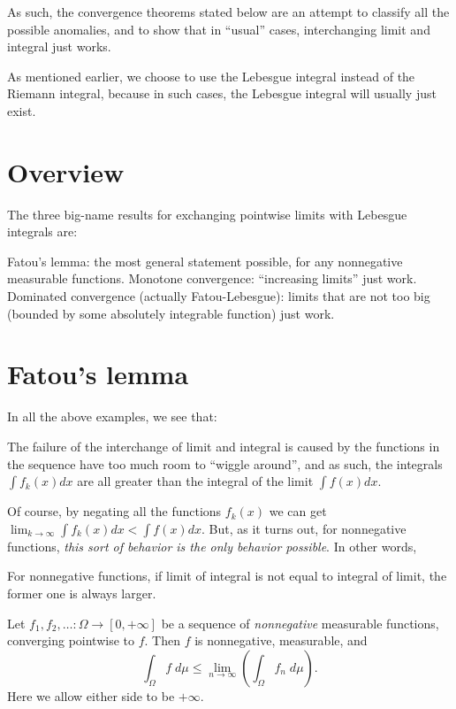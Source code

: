 As such, the convergence theorems stated below are an attempt to classify all the possible anomalies,
and to show that in ``usual'' cases, interchanging limit and integral just works.

As mentioned earlier, we choose to use the Lebesgue integral instead of the Riemann integral,
because in such cases, the Lebesgue integral will usually just exist.


\section{Overview}
The three big-name results for exchanging
pointwise limits with Lebesgue integrals are:
\begin{itemize}
	\ii Fatou's lemma: the most general statement possible,
	for any nonnegative measurable functions.
	\ii Monotone convergence: ``increasing limits'' just work.
	\ii Dominated convergence (actually Fatou-Lebesgue):
	limits that are not too big
	(bounded by some absolutely integrable function) just work.
\end{itemize}

\section{Fatou's lemma}

In all the above examples, we see that:
\begin{itemize}
	\ii The failure of the interchange of limit and integral is caused by
	the functions in the sequence have too much room to ``wiggle around'', and
	\ii as such, the integrals $\int f_k(x) dx$ are all greater than the integral of the limit $\int f(x)
	dx$.
\end{itemize}
Of course, by negating all the functions $f_k(x)$ we can get $\lim_{k \to \infty} \int f_k(x) dx < \int
f(x) dx$.
But, as it turns out, for nonnegative functions, \emph{this sort of behavior is the only behavior
possible}. In other words,
\begin{moral}
	For nonnegative functions, if limit of integral is not equal to integral of limit, the former one is
	always larger.
\end{moral}

\begin{lemma}
	Let $f_1, f_2, \dots \colon \Omega \to [0,+\infty]$
	be a sequence of \emph{nonnegative} measurable functions, converging pointwise to $f$.
	Then $f$ is nonnegative, measurable, and
	\[ \int_\Omega f \; d\mu
		\le \lim_{n \to \infty} \left( \int_\Omega f_n \; d\mu \right).  \]
	Here we allow either side to be $+\infty$.
\end{lemma}


